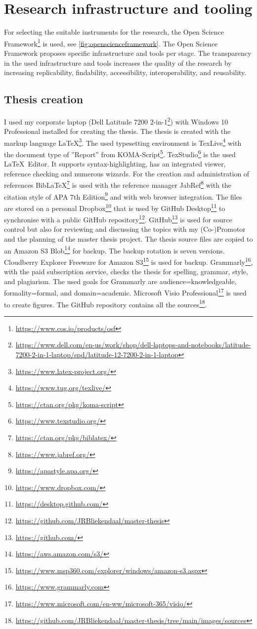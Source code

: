 \section{Research infrastructure and tooling}
\label{sec:researchinfraandtooling}

For selecting the suitable instruments for the research, the Open Science Framework\footnote{\url{https://www.cos.io/products/osf}} is used, see \cref{fig:openscienceframework}. The Open Science Framework proposes specific infrastructure and tools per stage. The transparency in the used infrastructure and tools increases the quality of the research by increasing replicability, findability, accessibility, interoperability, and reusability.

\subsection{Thesis creation}
\label{sub:tbresearchcreation}
I used my corporate laptop (Dell Latitude 7200 2-in-1\footnote{\url{https://www.dell.com/en-us/work/shop/dell-laptops-and-notebooks/latitude-7200-2-in-1-laptop/spd/latitude-12-7200-2-in-1-laptop}}) with Windows 10 Professional installed for creating the thesis. The thesis is created with the markup language \LaTeX\footnote{\url{https://www.latex-project.org/}}. The used typesetting environment is TexLive\footnote{\url{https://www.tug.org/texlive/}} with the document type of ''Report'' from KOMA-Script\footnote{\url{https://ctan.org/pkg/koma-script}}. TexStudio\footnote{\url{https://www.texstudio.org/}} is the used \LaTeX\ Editor. It supports syntax-highlighting, has an integrated viewer, reference checking and numerous wizards. For the creation and administration of references Bib\LaTeX\footnote{\url{https://ctan.org/pkg/biblatex/}} is used with the reference manager JabRef\footnote{\url{https://www.jabref.org/}} with the citation style of APA 7th Edition\footnote{\url{https://apastyle.apa.org/}} and with web browser integration. The files are stored on a personal Dropbox\footnote{\url{https://www.dropbox.com/}} that is used by GitHub Desktop\footnote{\url{https://desktop.github.com/}} to synchronise with a public GitHub repository\footnote{\url{https://github.com/JRBliekendaal/master-thesis}}. GitHub\footnote{\url{https://github.com/}} is used for source control but also for reviewing and discussing the topics with my (Co-)Promotor and the planning of the master thesis project. The thesis source files are copied to an Amazon S3 Blob\footnote{\url{https://aws.amazon.com/s3/}} for backup. The backup rotation is seven versions. Cloudberry Explorer Freeware for Amazon S3\footnote{\url{https://www.msp360.com/explorer/windows/amazon-s3.aspx}} is used for backup. Grammarly\footnote{\url{https://www.grammarly.com}}, with the paid subscription service, checks the thesis for spelling, grammar,  style, and plagiarism. The used goals for Grammarly are audience=knowledgeable, formality=formal, and domain=academic. Microsoft Visio Professional\footnote{\url{https://www.microsoft.com/en-ww/microsoft-365/visio/}} is used to create figures. The GitHub repository contains all the sources\footnote{\url{https://github.com/JRBliekendaal/master-thesis/tree/main/images/sources}}.
